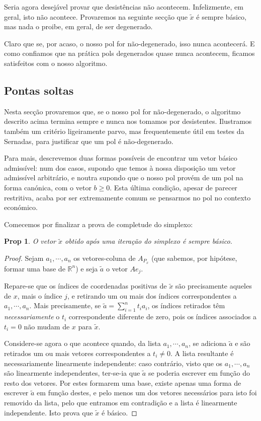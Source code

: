 \documentclass{article}
\newcommand{\R}{\mathbb{R}}
\newtheorem{prop}{Prop}
\theoremstyle{definition}
\begin{document}
	Seria agora desejável provar que desistências não acontecem. Infelizmente, em geral, isto não acontece. Provaremos na seguinte secção que $\tilde x$ é sempre básico, mas nada o proibe, em geral, de ser degenerado.
	
	Claro que se, por acaso, o nosso pol for não-degenerado, isso nunca acontecerá. E como confiamos que na prática pols degenerados quase nunca acontecem, ficamos satisfeitos com o nosso algoritmo.
	
	\subsection{Pontas soltas}
	
	Nesta secção provaremos que, se o nosso pol for não-degenerado, o algoritmo descrito acima termina sempre e nunca nos tomamos por desistentes. Ilustramos também um critério ligeiramente parvo, mas frequentemente útil em testes da Sernadas, para justificar que um pol é não-degenerado.
	
	Para mais, descrevemos duas formas possíveis de encontrar um vetor básico admissível: num dos casos, supondo que temos à nossa disposição um vetor admissível arbitrário, e noutra supondo que o nosso pol provém de um pol na forma canónica, com o vetor $b \geq 0$. Esta última condição, apesar de parecer restritiva, acaba por ser extremamente comum se pensarmos no pol no contexto económico.
	
	Comecemos por finalizar a prova de completude do simplexo:
	
	\begin{prop}
	O vetor $\tilde x$ obtido após uma iteração do simplexo é sempre básico.
	\end{prop}
	
	\begin{proof}
	Sejam $a_1, \cdots, a_n$ os vetores-coluna de $A_{P_x}$ (que sabemos, por hipótese, formar uma base de $\R^n$) e seja $\tilde a$ o vetor $A e_j$.
	
	Repare-se que os índices de coordenadas positivas de $\tilde x$ são precisamente aqueles de $x$, mais o índice $j$, e retirando um ou mais dos índices correspondentes a $a_1, \cdots, a_n$. Mais precisamente, se $\tilde a = \sum_{i=1}^n t_i a_i$, os índices retirados têm \emph{necessariamente} o $t_i$ correspondente diferente de zero, pois os índices associados a $t_i=0$ não mudam de $x$ para $\tilde x$.
	
	Considere-se agora o que acontece quando, da lista $a_1, \cdots, a_n$, se adiciona $\tilde a$ e são retirados um ou mais vetores correspondentes a $t_i \neq 0$. A lista resultante é necessariamente linearmente independente: caso contrário, visto que os $a_1, \cdots, a_n$ são linearmente independentes, ter-se-ia que $\tilde a$ se poderia escrever em função do resto dos vetores. Por estes formarem uma base, existe apenas uma forma de escrever $\tilde a$ em função destes, e pelo menos um dos vetores necessários para isto foi removido da lista, pelo que entramos em contradição e a lista é linearmente independente. Isto prova que $\tilde x$ é básico.
	\end{proof}
	
\end{document}
